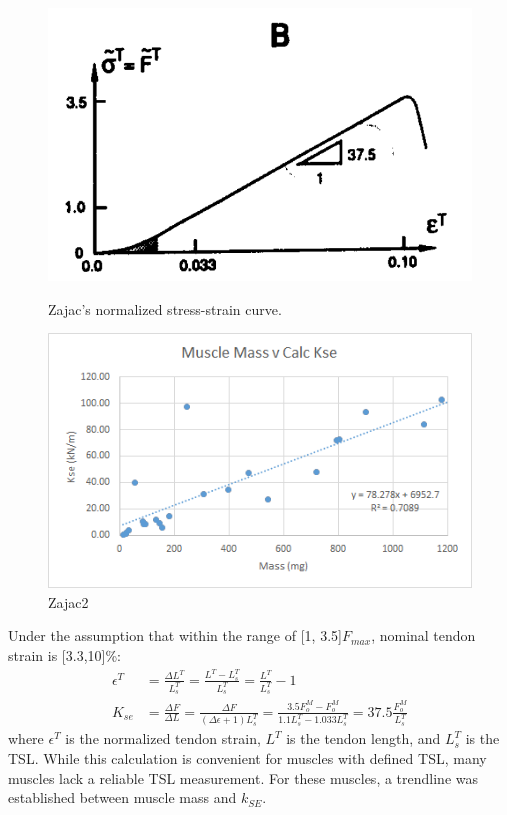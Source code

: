 \documentclass[runningheads,a4paper]{llncs}
\begin{document}
			\begin{figure}[!htbp]
			    \begin{minipage}{0.5\textwidth}
			        \centering
			        \includegraphics[width=\textwidth]{Figures/zajac1.PNG}
			        \caption{Zajac's normalized stress-strain curve.}
			        \label{fig:stress-strain}
			    \end{minipage}\hfill
			    \begin{minipage}{0.5\textwidth}
			        \centering
			        \includegraphics[width=\textwidth]{Figures/zajac3.png}
			        \caption{Zajac2}
			        \label{fig:img2}
			    \end{minipage}
			\end{figure}
			
		 Under the assumption that within the range of [1, 3.5]$F_{max}$, nominal tendon strain is [3.3,10]\%:
			\begin{align*}
				\epsilon^{T} &= \frac{\Delta L^{T}}{L_{s}^{T}}
				= \frac{L^{T}-L_{s}^{T}}{L_{s}^{T}}
				= \frac{L^{T}}{L_{s}^{T}} - 1 \\
				K_{se} &= \frac{\Delta F}{\Delta L}
				= \frac{\Delta F}{(\Delta \epsilon+1)L_{s}^{T}}
				= \frac{3.5 F_{o}^{M} - F_{o}^{M}}{1.1 L_{s}^{T} - 1.033 L_{s}^{T}}
				= 37.5 \frac{F_{o}^{M}}{L_{s}^{T}}
			\end{align*}
		where $\epsilon^{T}$ is the normalized tendon strain, $L^{T}$ is the tendon length, and $L_{s}^{T}$ is the TSL. While this calculation is convenient for muscles with defined TSL, many muscles lack a reliable TSL measurement. For these muscles, a trendline was established between muscle mass and $k_{SE}$.
\end{document}
